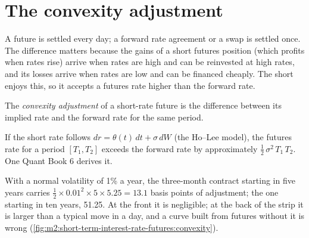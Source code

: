 \section{The convexity adjustment}\label{sec:m2:short-term-interest-rate-futures:convexity}

A future is settled every day; a forward rate agreement or a swap is settled
once. The difference matters because the gains of a short futures position
(which profits when rates rise) arrive when rates are high and can be
reinvested at high rates, and its losses arrive when rates are low and can be
financed cheaply. The short enjoys this, so it accepts a futures rate higher
than the forward rate.

\begin{definition}\label{def:m2:short-term-interest-rate-futures:convexity}
The \emph{convexity adjustment} of a short-rate
future is the difference between its implied rate and the forward rate for
the same period.
\end{definition}

\begin{proposition}\label{prop:m2:short-term-interest-rate-futures:holee}
If the short rate follows $dr = \theta(t)\,dt + \sigma\,dW$ (the Ho--Lee model),
the futures rate for a period $[T_1, T_2]$ exceeds the forward rate by
approximately $\tfrac12\,\sigma^2\,T_1\,T_2$. One Quant Book 6 derives it.
\end{proposition}
\admitted

\begin{example}\label{ex:m2:short-term-interest-rate-futures:convexity}
With a normal volatility of 1\% a year, the three-month contract starting in
five years carries $\frac12 \times 0.01^2 \times 5 \times 5.25 = 13.1$ basis points of
adjustment; the one starting in ten years, 51.25. At the front it is negligible;
at the back of the strip it is larger than a typical move in a day, and a
curve built from futures without it is wrong
(\cref{fig:m2:short-term-interest-rate-futures:convexity}).
\end{example}

